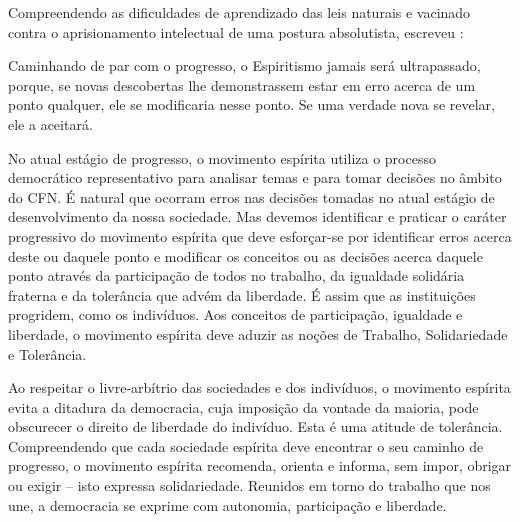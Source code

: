 Compreendendo as dificuldades de aprendizado das leis naturais e vacinado contra o aprisionamento intelectual de uma postura absolutista, escreveu :

\begin{citacao}
	Caminhando de par com o progresso, o Espiritismo jamais será ultrapassado, porque, se novas descobertas lhe demonstrassem estar em erro acerca de um ponto qualquer, ele se modificaria nesse ponto. Se uma verdade nova se revelar, ele a aceitará.

\end{citacao}

No atual estágio de progresso, o movimento espírita utiliza o processo democrático representativo para analisar temas e para tomar decisões no âmbito do CFN. É natural que ocorram erros nas decisões tomadas no atual estágio de desenvolvimento da nossa sociedade. Mas devemos identificar e praticar o caráter progressivo do movimento espírita que deve esforçar-se por identificar erros acerca deste ou daquele ponto e modificar os conceitos ou as decisões acerca daquele ponto através da participação de todos no trabalho, da igualdade solidária fraterna e da tolerância que advém da liberdade. É assim que as instituições progridem, como os indivíduos. Aos conceitos de participação, igualdade e liberdade, o movimento espírita deve aduzir as noções de Trabalho, Solidariedade e Tolerância.

Ao respeitar o livre-arbítrio das sociedades e dos indivíduos, o movimento espírita evita a ditadura da democracia, cuja imposição da vontade da maioria, pode obscurecer o direito de liberdade do indivíduo. Esta é uma atitude de tolerância. Compreendendo que cada sociedade espírita deve encontrar o seu caminho de progresso, o movimento espírita recomenda, orienta e informa, sem impor, obrigar ou exigir -- isto expressa solidariedade. Reunidos em torno do trabalho que nos une, a democracia se exprime com autonomia, participação e liberdade.
 

